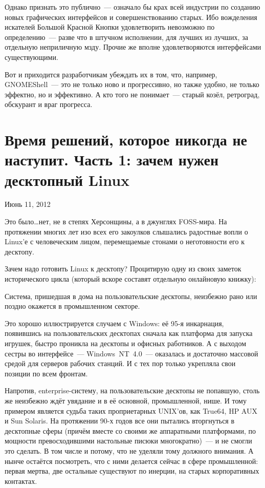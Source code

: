 Однако признать это публично~--- означало бы крах всей индустрии по созданию новых графических интерфейсов и совершенствованию старых. Ибо вожделения искателей Большой Красной Кнопки удовлетворить невозможно по определению~--- разве что в штучном исполнении, для лучших из лучших, за отдельную неприличную мзду. Прочие же вполне удовлетворяются интерфейсами существующими.

Вот и приходится разработчикам убеждать их в том, что, например, GNOMEShell~--- это не только ново и прогрессивно, но также удобно, не только эффектно, но и эффективно. А кто того не понимает~--- старый козёл, ретроград, обскурант и враг прогресса.

\section{Время решений, которое никогда не наступит. Часть 1: зачем нужен десктопный Linux} 
\begin{timeline}Июнь 11, 2012\end{timeline}

Это было\dots нет, не в степях Херсонщины, а в джунглях FOSS-мира. На протяжении многих лет изо всех его закоулков слышались радостные вопли о Linux'е с человеческим лицом, перемещаемые стонами о неготовности его к десктопу.

Зачем надо готовить Linux к десктопу? Процитирую одну из своих заметок исторического цикла (который вскоре составят отдельную онлайновую книжку):
\begin{shadequote}{}
Система, пришедшая в дома на пользовательские десктопы, неизбежно рано или поздно окажется в промышленном секторе.
\end{shadequote}
Это хорошо иллюстрируется случаем с Windows: её 95-я инкарнация, появившись на пользовательских десктопах сначала как платформа для запуска игрушек, быстро проникла на десктопы и офисных работников. А с выходом сестры во интерфейсе~--- Windows~NT~4.0~--- оказалась и достаточно массовой средой для серверов рабочих станций. И с тех пор только укрепляла свои позиции по всем фронтам.

Напротив, enterprise-систему, на пользовательские десктопы не попавшую, столь же неизбежно ждёт увядание и в её основной, промышленной, нише. И тому примером является судьба таких проприетарных UNIX'ов, как True64, HP AUX и Sun Solaris. На протяжении 90-х годов все они пытались вторгнуться в десктопные сферы (причём вместе со своими же аппаратными платформами, по мощности превосходившими настольные писюки многократно)~--- и не смогли это сделать. В том числе и потому, что не уделяли тому должного внимания. А нынче остаётся посмотреть, что с ними делается сейчас в сфере промышленной: первая мертва, две остальные существуют по инерции, на старых корпоративных контактах.

